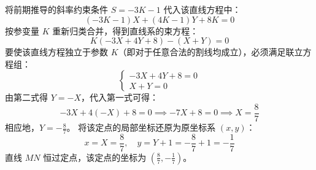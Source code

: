 \begin{solution}
将前期推导的斜率约束条件 $S = -3K - 1$ 代入该直线方程中：
$$ (-3K - 1) X + (4K - 1) Y + 8K = 0 $$
按参变量 $K$ 重新归类合并，得到直线系的束方程：
$$ K(-3X + 4Y + 8) - (X + Y) = 0 $$
要使该直线方程独立于参数 $K$（即对于任意合法的割线均成立），必须满足联立方程组：
$$ \begin{cases} -3X + 4Y + 8 = 0 \\ X + Y = 0 \end{cases} $$
由第二式得 $Y = -X$，代入第一式可得：
$$ -3X + 4(-X) + 8 = 0 \implies -7X + 8 = 0 \implies X = \frac{8}{7} $$
相应地，$Y = -\frac{8}{7}$。
将该定点的局部坐标还原为原坐标系 $(x,y)$：
$$ x = X = \frac{8}{7}, \quad y = Y + 1 = -\frac{8}{7} + 1 = -\frac{1}{7} $$
直线 $MN$ 恒过定点，该定点的坐标为 $\left(\frac{8}{7}, -\frac{1}{7}\right)$。
\end{solution}

